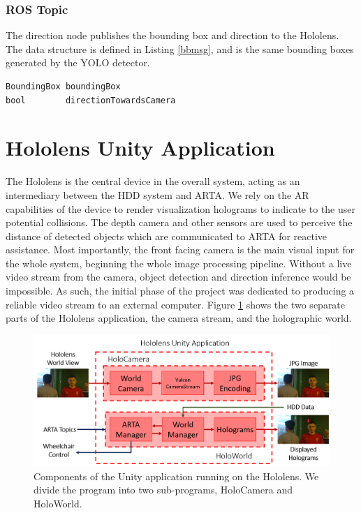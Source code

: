 \vspace{-1\baselineskip}

\subsubsection{ROS Topic} \label{sec:yachtDirROS}
The direction node publishes the bounding box and direction to the Hololens. The  data structure is defined in Listing \ref{bbmsg}, and is the same bounding boxes generated by the YOLO detector. \\

\begin{lstlisting}[language=Mymatlab,caption={ROS message structure for BoundingBoxDirection.msg}]
BoundingBox boundingBox
bool        directionTowardsCamera
\end{lstlisting}

\newpage
\section{Hololens Unity Application}
The Hololens is the central device in the overall system, acting as an intermediary between the HDD system and ARTA. We rely on the AR capabilities of the device to render visualization holograms to indicate to the user potential collisions. The depth camera and other sensors are used to perceive the distance of detected objects which are communicated to ARTA for reactive assistance. Most importantly, the front facing camera is the main visual input for the whole system, beginning the whole image processing pipeline. Without a live video stream from the camera, object detection and direction inference would be impossible. As such, the initial phase of the project was dedicated to producing a reliable video stream to an external computer. Figure \ref{fig:detailedHololens} shows the two separate parts of the Hololens application, the camera stream, and the holographic world. 

\begin{figure}[ht]
    \centering
    \includegraphics[width=1.0\linewidth]{img/chapter5_implementation/hololensSystemDiagram.png}
    \caption{Components of the Unity application running on the Hololens. We divide the program into two sub-programs, HoloCamera and HoloWorld.}
    \label{fig:detailedHololens}
\end{figure}


